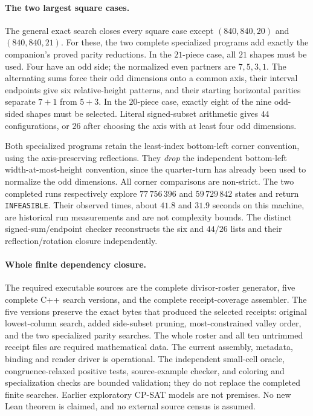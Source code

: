 \documentclass[11pt]{article}
\begin{document}
\paragraph{The two largest square cases.}
The general exact search closes every square case except $(840,840,20)$ and
$(840,840,21)$. For these, the two complete specialized programs add exactly the
companion's proved parity reductions. In the $21$-piece case, all $21$ shapes
must be used. Four have an odd side; the normalized even partners are $7,5,3,1$.
The alternating sums force their odd dimensions onto a common axis, their
interval endpoints give six relative-height patterns, and their starting
horizontal parities separate $7+1$ from $5+3$. In the $20$-piece case, exactly
eight of the nine odd-sided shapes must be selected. Literal signed-subset
arithmetic gives $44$ configurations, or $26$ after choosing the axis with at
least four odd dimensions.

Both specialized programs retain the least-index bottom-left corner convention,
using the axis-preserving reflections. They \emph{drop} the independent
bottom-left width-at-most-height convention, since the quarter-turn has already
been used to normalize the odd dimensions. All corner comparisons are non-strict.
The two completed runs respectively explore $77\,756\,396$ and $59\,729\,842$
states and return \texttt{INFEASIBLE}. Their observed times, about $41.8$ and
$31.9$ seconds on this machine, are historical run measurements and are not
complexity bounds. The distinct signed-sum/endpoint checker reconstructs the
six and $44/26$ lists and their reflection/rotation closure independently.

\paragraph{Whole finite dependency closure.}
The required executable sources are the complete divisor-roster generator,
five complete C++ search versions, and the complete receipt-coverage assembler.
The five versions preserve the exact bytes that produced the selected receipts:
original lowest-column search, added side-subset pruning, most-constrained valley
order, and the two specialized parity searches. The whole roster and all ten
untrimmed receipt files are required mathematical data. The current assembly,
metadata, binding and render driver is operational. The independent small-cell
oracle, congruence-relaxed positive tests, source-example checker, and coloring
and specialization checks are bounded validation; they do not replace the
completed finite searches. Earlier exploratory CP-SAT models are not premises.
No new Lean theorem is claimed, and no external source census is assumed.
\end{document}

